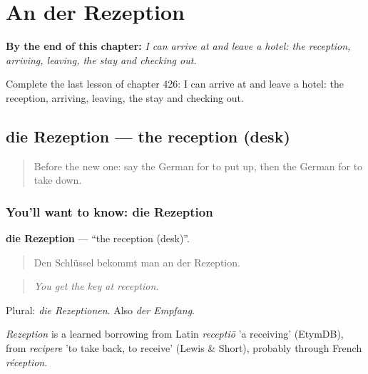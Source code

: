 
\chapter{An der Rezeption}
\label{ch:ge-an-der-rezeption}

\begin{chapteropening}
\textbf{By the end of this chapter:} \emph{I can arrive at and leave a hotel: the reception, arriving, leaving, the stay and checking out.}

Complete the last lesson of chapter 426: I can arrive at and leave a hotel: the reception, arriving, leaving, the stay and checking out.
\end{chapteropening}

\section[die Rezeption]{die Rezeption — the reception (desk)}

\label{lesson:GE-C426-rezeption}



\begin{quote}
Before the new one: say the German for to put up, then the German for to take down.
\end{quote}

\subsection*{You'll want to know: die Rezeption}
\textbf{die Rezeption} — \textquotedblleft{}the reception (desk)\textquotedblright{}.

\begin{quote}
Den Schlüssel bekommt man an der Rezeption.
\end{quote}

\begin{quote}
\emph{You get the key at reception.}
\end{quote}

Plural: \emph{die Rezeptionen}. Also \emph{der Empfang}.

\begin{cousinweb}
\emph{Rezeption} is a learned borrowing from Latin \emph{receptiō} 'a receiving' (EtymDB), from \emph{recipere} 'to take back, to receive' (Lewis \& Short), probably through French \emph{réception}.
\end{cousinweb}

